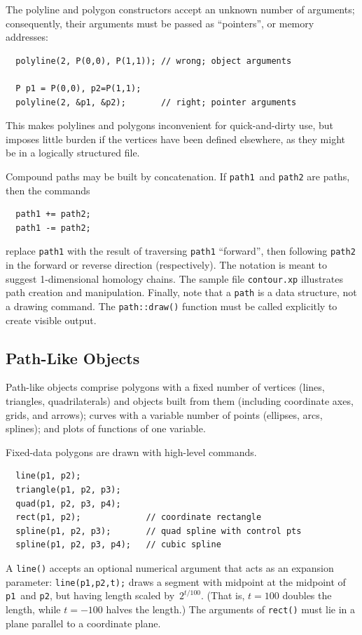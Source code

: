 \documentclass[12pt]{report}
\newcommand{\code}[1]{\texttt{#1}}
\newcommand{\filename}[1]{\texttt{#1}}
\begin{document}
The polyline and polygon constructors accept an unknown number of
arguments; consequently, their arguments must be passed as
``pointers'', or memory addresses:
\begin{verbatim}
  polyline(2, P(0,0), P(1,1)); // wrong; object arguments

  P p1 = P(0,0), p2=P(1,1);
  polyline(2, &p1, &p2);       // right; pointer arguments
\end{verbatim}
This makes polylines and polygons inconvenient for quick-and-dirty
use, but imposes little burden if the vertices have been defined
elsewhere, as they might be in a logically structured file.

Compound paths may be built by concatenation. If \code{path1}~and
\code{path2} are paths, then the commands
\begin{verbatim}
  path1 += path2;
  path1 -= path2;
\end{verbatim}
replace \code{path1} with the result of traversing \code{path1}
``forward'', then following \code{path2} in the forward or reverse
direction (respectively). The notation is meant to suggest
1-dimensional homology chains. The sample file \filename{contour.xp}
illustrates path creation and manipulation.  Finally, note that a
\code{path} is a data structure, not a drawing command. The
\code{path::draw()} function must be called explicitly to create
visible output.


\subsection*{Path-Like Objects}

Path-like objects comprise polygons with a fixed number of vertices
(lines, triangles, quadrilaterals) and objects built from them
(including coordinate axes, grids, and arrows); curves with a variable
number of points (ellipses, arcs, splines); and plots of functions of
one variable.

Fixed-data polygons are drawn with high-level commands.
\begin{verbatim}
  line(p1, p2);
  triangle(p1, p2, p3);
  quad(p1, p2, p3, p4);
  rect(p1, p2);             // coordinate rectangle
  spline(p1, p2, p3);       // quad spline with control pts
  spline(p1, p2, p3, p4);   // cubic spline
\end{verbatim}
A \code{line()} accepts an optional numerical argument that acts as
an expansion parameter: \code{line(p1,p2,t);} draws a segment with
midpoint at the midpoint of \code{p1}~and \code{p2}, but having
length scaled by~$2^{t/100}$. (That is, $t=100$ doubles the length,
while $t=-100$ halves the length.) The arguments of \code{rect()}
must lie in a plane parallel to a coordinate plane.
\end{document}

